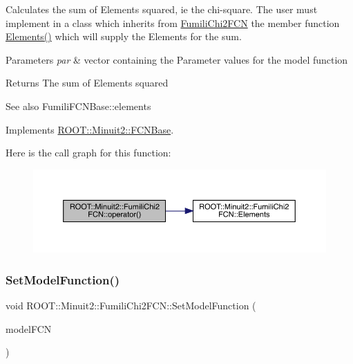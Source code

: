Calculates the sum of Elements squared, ie the chi-\/square. The user must implement in a class which inherits from \mbox{\hyperlink{classROOT_1_1Minuit2_1_1FumiliChi2FCN}{Fumili\+Chi2\+F\+CN}} the member function \mbox{\hyperlink{classROOT_1_1Minuit2_1_1FumiliChi2FCN_a25cc8dcc2eff831b3c0a94bf5413c2cd}{Elements()}} which will supply the Elements for the sum.


\begin{DoxyParams}{Parameters}
{\em par} & vector containing the Parameter values for the model function\\
\hline
\end{DoxyParams}
\begin{DoxyReturn}{Returns}
The sum of Elements squared
\end{DoxyReturn}
\begin{DoxySeeAlso}{See also}
Fumili\+F\+C\+N\+Base\+::elements 
\end{DoxySeeAlso}


Implements \mbox{\hyperlink{classROOT_1_1Minuit2_1_1FCNBase_ae4a86bd94d0d0f5ca6fc8f8ab2bb43cd}{R\+O\+O\+T\+::\+Minuit2\+::\+F\+C\+N\+Base}}.

Here is the call graph for this function\+:
\nopagebreak
\begin{figure}[H]
\begin{center}
\leavevmode
\includegraphics[width=350pt]{d3/df0/classROOT_1_1Minuit2_1_1FumiliChi2FCN_ae7b2c2080162c0b946cf54090b712716_cgraph}
\end{center}
\end{figure}
\mbox{\label{classROOT_1_1Minuit2_1_1FumiliChi2FCN_a0db1c6dd4cbdc96107490f572cce20da}} 
\subsubsection{\texorpdfstring{SetModelFunction()}{SetModelFunction()}\hspace{0.1cm}{\footnotesize\ttfamily [1/3]}}
{\footnotesize\ttfamily void R\+O\+O\+T\+::\+Minuit2\+::\+Fumili\+Chi2\+F\+C\+N\+::\+Set\+Model\+Function (\begin{DoxyParamCaption}\item[{const \mbox{\hyperlink{classROOT_1_1Minuit2_1_1ParametricFunction}{Parametric\+Function}} \&}]{model\+F\+CN }\end{DoxyParamCaption})\hspace{0.3cm}{\ttfamily [inline]}}

